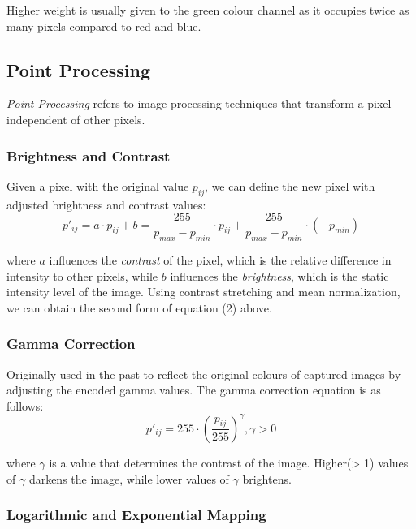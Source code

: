 \documentclass[12pt]{article}
\begin{document}
Higher weight is usually given to the green colour channel as it occupies twice as many pixels compared to red and blue.

\subsection{Point Processing}

\textit{Point Processing} refers to image processing techniques that transform a pixel independent of other pixels.

\subsubsection{Brightness and Contrast}

Given a pixel with the original value $p_{ij}$, we can define the new pixel with adjusted brightness and contrast values:
\begin{equation}
p'_{ij} = a \cdot p_{ij} + b = \frac{255}{p_{max} - p_{min}} \cdot p_{ij} + \frac{255}{p_{max} - p_{min}} \cdot (-p_{min})
\end{equation}

where $a$ influences the \textit{contrast} of the pixel, which is the relative difference in intensity to other pixels, while $b$ influences the \textit{brightness}, which is the static intensity level of the image. Using contrast stretching and mean normalization, we can obtain the second form of 
equation (2) above. \\

\subsubsection{Gamma Correction}

Originally used in the past to reflect the original colours of captured images by adjusting the encoded gamma values. The gamma correction equation is as follows:
\begin{equation}
p'_{ij} = 255 \cdot (\frac{p_{ij}}{255})^\gamma, \gamma > 0
\end{equation}

where $\gamma$ is a value that determines the contrast of the image. Higher(> 1) values of $\gamma$ darkens the image, while 
lower values of $\gamma$ brightens.\\

\subsubsection{Logarithmic and Exponential Mapping}
\end{document}
